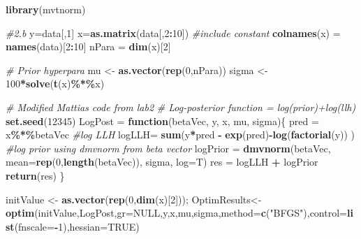 \documentclass[]{article}
\newenvironment{Shaded}{\begin{snugshade}}{\end{snugshade}}
\newcommand{\CommentTok}[1]{\textcolor[rgb]{0.56,0.35,0.01}{\textit{#1}}}
\newcommand{\ControlFlowTok}[1]{\textcolor[rgb]{0.13,0.29,0.53}{\textbf{#1}}}
\newcommand{\DataTypeTok}[1]{\textcolor[rgb]{0.13,0.29,0.53}{#1}}
\newcommand{\DecValTok}[1]{\textcolor[rgb]{0.00,0.00,0.81}{#1}}
\newcommand{\KeywordTok}[1]{\textcolor[rgb]{0.13,0.29,0.53}{\textbf{#1}}}
\newcommand{\NormalTok}[1]{#1}
\newcommand{\OperatorTok}[1]{\textcolor[rgb]{0.81,0.36,0.00}{\textbf{#1}}}
\newcommand{\OtherTok}[1]{\textcolor[rgb]{0.56,0.35,0.01}{#1}}
\newcommand{\StringTok}[1]{\textcolor[rgb]{0.31,0.60,0.02}{#1}}
\begin{document}
\begin{Shaded}
\begin{Highlighting}[]
\KeywordTok{library}\NormalTok{(mvtnorm)}

\CommentTok{\#2.b}
\NormalTok{y=data[,}\DecValTok{1}\NormalTok{]}
\NormalTok{x=}\KeywordTok{as.matrix}\NormalTok{(data[,}\DecValTok{2}\OperatorTok{:}\DecValTok{10}\NormalTok{]) }\CommentTok{\#include constant}
\KeywordTok{colnames}\NormalTok{(x) =}\StringTok{ }\KeywordTok{names}\NormalTok{(data)[}\DecValTok{2}\OperatorTok{:}\DecValTok{10}\NormalTok{]}
\NormalTok{nPara =}\StringTok{ }\KeywordTok{dim}\NormalTok{(x)[}\DecValTok{2}\NormalTok{]}

\CommentTok{\# Prior hyperpara}
\NormalTok{mu \textless{}{-}}\StringTok{ }\KeywordTok{as.vector}\NormalTok{(}\KeywordTok{rep}\NormalTok{(}\DecValTok{0}\NormalTok{,nPara)) }
\NormalTok{sigma \textless{}{-}}\StringTok{ }\DecValTok{100}\OperatorTok{*}\KeywordTok{solve}\NormalTok{(}\KeywordTok{t}\NormalTok{(x)}\OperatorTok{\%*\%}\NormalTok{x)}

\CommentTok{\# Modified Mattias\textquotesingle{} code from lab2}
\CommentTok{\# Log{-}posterior function = log(prior)+log(llh)}
\KeywordTok{set.seed}\NormalTok{(}\DecValTok{12345}\NormalTok{)}
\NormalTok{LogPost =}\StringTok{ }\ControlFlowTok{function}\NormalTok{(betaVec, y, x, mu, sigma)\{}
\NormalTok{  pred =}\StringTok{ }\NormalTok{x}\OperatorTok{\%*\%}\NormalTok{betaVec}
  \CommentTok{\#log LLH}
\NormalTok{  logLLH=}\StringTok{ }\KeywordTok{sum}\NormalTok{(y}\OperatorTok{*}\NormalTok{pred }\OperatorTok{{-}}\StringTok{ }\KeywordTok{exp}\NormalTok{(pred)}\OperatorTok{{-}}\KeywordTok{log}\NormalTok{(}\KeywordTok{factorial}\NormalTok{(y)) )}
  \CommentTok{\#log prior using dmvnorm from beta vector}
\NormalTok{  logPrior =}\StringTok{ }\KeywordTok{dmvnorm}\NormalTok{(betaVec, }\DataTypeTok{mean=}\KeywordTok{rep}\NormalTok{(}\DecValTok{0}\NormalTok{,}\KeywordTok{length}\NormalTok{(betaVec)), sigma, }\DataTypeTok{log=}\NormalTok{T)}
\NormalTok{  res =}\StringTok{ }\NormalTok{logLLH }\OperatorTok{+}\StringTok{ }\NormalTok{logPrior}
  \KeywordTok{return}\NormalTok{(res)}
\NormalTok{\}}

\NormalTok{initValue \textless{}{-}}\StringTok{ }\KeywordTok{as.vector}\NormalTok{(}\KeywordTok{rep}\NormalTok{(}\DecValTok{0}\NormalTok{,}\KeywordTok{dim}\NormalTok{(x)[}\DecValTok{2}\NormalTok{])); }
\NormalTok{OptimResults\textless{}{-}}\KeywordTok{optim}\NormalTok{(initValue,LogPost,}\DataTypeTok{gr=}\OtherTok{NULL}\NormalTok{,y,x,mu,sigma,}\DataTypeTok{method=}\KeywordTok{c}\NormalTok{(}\StringTok{"BFGS"}\NormalTok{),}\DataTypeTok{control=}\KeywordTok{list}\NormalTok{(}\DataTypeTok{fnscale=}\OperatorTok{{-}}\DecValTok{1}\NormalTok{),}\DataTypeTok{hessian=}\OtherTok{TRUE}\NormalTok{)}


\end{Highlighting}
\end{Shaded}
\end{document}
